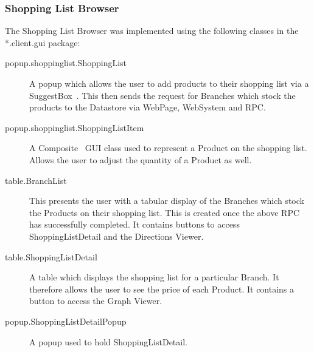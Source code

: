 \subsubsection{Shopping List Browser}
The Shopping List Browser was implemented using the following classes in the *.client.gui package:
\begin{description}
\item[popup.shoppinglist.ShoppingList] A popup which allows the user to add products to their shopping list via a SuggestBox~\cite{suggest}. This then sends the request for Branches which stock the products to the Datastore via WebPage, WebSystem and RPC.
\item[popup.shoppinglist.ShoppingListItem] A Composite~\cite{comp} GUI class used to represent a Product on the shopping list. Allows the user to adjust the quantity of a Product as well.
\item[table.BranchList] This presents the user with a tabular display of the Branches which stock the Products on their shopping list. This is created once the above RPC has successfully completed. It contains buttons to access ShoppingListDetail and the Directions Viewer.
\item[table.ShoppingListDetail] A table which displays the shopping list for a particular Branch. It therefore allows the user to see the price of each Product. It contains a button to access the Graph Viewer.
\item[popup.ShoppingListDetailPopup]A popup used to hold ShoppingListDetail.
\end{description}

